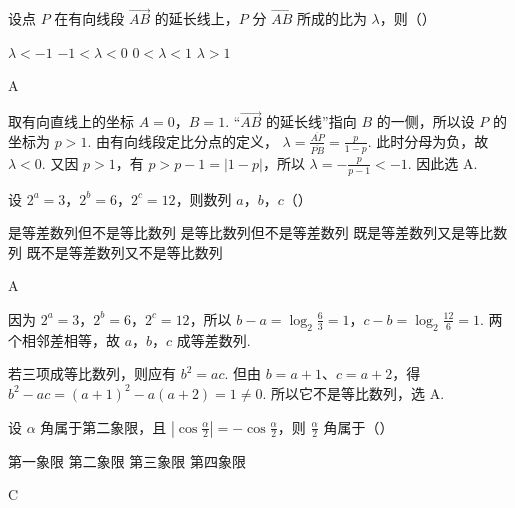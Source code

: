 \documentclass[UTF8,a4paper,oneside,11pt]{ctexbook}
\begin{document}
\begin{problem}
设点 \(P\) 在有向线段 \(\overrightarrow{AB}\) 的延长线上，\(P\) 分 \(\overrightarrow{AB}\) 所成的比为 \(\lambda\)，则（\quad）

\choices
    {\(\lambda<-1\)}
    {\(-1<\lambda<0\)}
    {\(0<\lambda<1\)}
    {\(\lambda>1\)}
\end{problem}

\begin{answer}
A
\end{answer}

\begin{solution}
取有向直线上的坐标 \(A=0\)，\(B=1\). “\(\overrightarrow{AB}\) 的延长线”指向 \(B\) 的一侧，所以设 \(P\) 的坐标为 \(p>1\). 由有向线段定比分点的定义，
\(\lambda=\frac{\overline{AP}}{\overline{PB}}=\frac{p}{1-p}\). 此时分母为负，故 \(\lambda<0\). 又因 \(p>1\)，有 \(p>p-1=|1-p|\)，所以
\(\lambda=-\frac{p}{p-1}<-1\). 因此选 A.
\end{solution}

\begin{problem}
设 \(2^a=3\)，\(2^b=6\)，\(2^c=12\)，则数列 \(a\)，\(b\)，\(c\)（\quad）

\choices
    {是等差数列但不是等比数列}
    {是等比数列但不是等差数列}
    {既是等差数列又是等比数列}
    {既不是等差数列又不是等比数列}
\end{problem}

\begin{answer}
A
\end{answer}

\begin{solution}
因为 \(2^a=3\)，\(2^b=6\)，\(2^c=12\)，所以
\(b-a=\log_2\frac{6}{3}=1\)，\(c-b=\log_2\frac{12}{6}=1\). 两个相邻差相等，故 \(a\)，\(b\)，\(c\) 成等差数列.

若三项成等比数列，则应有 \(b^2=ac\). 但由 \(b=a+1\)、\(c=a+2\)，得 \(b^2-ac=(a+1)^2-a(a+2)=1\ne0\). 所以它不是等比数列，选 A.
\end{solution}

\begin{problem}
设 \(\alpha\) 角属于第二象限，且 \(\left|\cos\frac{\alpha}{2}\right|=-\cos\frac{\alpha}{2}\)，则 \(\frac{\alpha}{2}\) 角属于（\quad）

\choices
    {第一象限}
    {第二象限}
    {第三象限}
    {第四象限}
\end{problem}

\begin{answer}
C
\end{answer}
\end{document}
